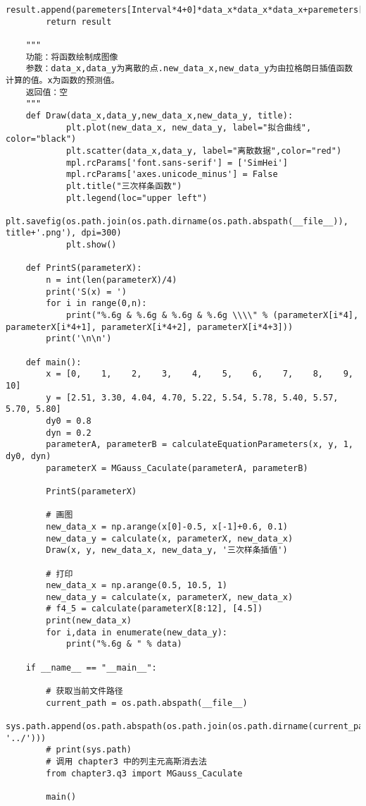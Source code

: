 \begin{lstlisting}[style = python]
            result.append(paremeters[Interval*4+0]*data_x*data_x*data_x+paremeters[Interval*4+1]*data_x*data_x+paremeters[Interval*4+2]*data_x+paremeters[Interval*4+3])
        return result
    
    """
    功能：将函数绘制成图像
    参数：data_x,data_y为离散的点.new_data_x,new_data_y为由拉格朗日插值函数计算的值。x为函数的预测值。
    返回值：空
    """
    def Draw(data_x,data_y,new_data_x,new_data_y, title):
            plt.plot(new_data_x, new_data_y, label="拟合曲线", color="black")
            plt.scatter(data_x,data_y, label="离散数据",color="red")
            mpl.rcParams['font.sans-serif'] = ['SimHei']
            mpl.rcParams['axes.unicode_minus'] = False
            plt.title("三次样条函数")
            plt.legend(loc="upper left")
            plt.savefig(os.path.join(os.path.dirname(os.path.abspath(__file__)), title+'.png'), dpi=300)
            plt.show()
    
    def PrintS(parameterX):
        n = int(len(parameterX)/4)
        print('S(x) = ')
        for i in range(0,n):
            print("%.6g & %.6g & %.6g & %.6g \\\\" % (parameterX[i*4], parameterX[i*4+1], parameterX[i*4+2], parameterX[i*4+3]))
        print('\n\n')
            
    def main():
        x = [0,    1,    2,    3,    4,    5,    6,    7,    8,    9,    10]
        y = [2.51, 3.30, 4.04, 4.70, 5.22, 5.54, 5.78, 5.40, 5.57, 5.70, 5.80]
        dy0 = 0.8
        dyn = 0.2  
        parameterA, parameterB = calculateEquationParameters(x, y, 1, dy0, dyn)
        parameterX = MGauss_Caculate(parameterA, parameterB)
    
        PrintS(parameterX)
    
        # 画图
        new_data_x = np.arange(x[0]-0.5, x[-1]+0.6, 0.1)
        new_data_y = calculate(x, parameterX, new_data_x)
        Draw(x, y, new_data_x, new_data_y, '三次样条插值')
    
        # 打印
        new_data_x = np.arange(0.5, 10.5, 1)
        new_data_y = calculate(x, parameterX, new_data_x)
        # f4_5 = calculate(parameterX[8:12], [4.5])
        print(new_data_x)
        for i,data in enumerate(new_data_y):
            print("%.6g & " % data)
    
    if __name__ == "__main__":
    
        # 获取当前文件路径
        current_path = os.path.abspath(__file__)
        sys.path.append(os.path.abspath(os.path.join(os.path.dirname(current_path), '../')))
        # print(sys.path)
        # 调用 chapter3 中的列主元高斯消去法
        from chapter3.q3 import MGauss_Caculate
    
        main()
\end{lstlisting}

